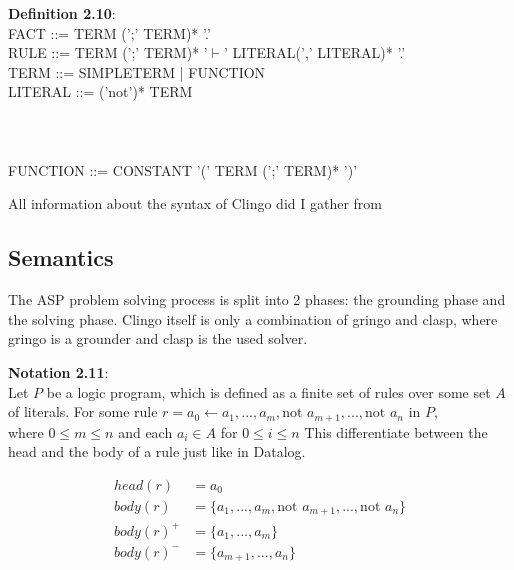 \documentclass[hyperref, bachelorofscience]{cgvpub}
\renewenvironment{shaded}{%
  \def\FrameCommand{\fboxsep=\FrameSep \colorbox{shadecolor}}%
  \MakeFramed{\advance\hsize-\width \FrameRestore\FrameRestore}}%
 {\endMakeFramed}
\begin{document}
\begin{shaded}
\textbf{Definition 2.10}: \\
FACT ::= TERM (';' TERM)* '.'  \\
RULE ::= TERM (';' TERM)* '$\vdash$' LITERAL(',' LITERAL)* '.'  \\
TERM ::= SIMPLETERM | FUNCTION \\
LITERAL ::= ('not')* TERM \\
 \\
 \\
 \\
FUNCTION ::= CONSTANT '(' TERM (';' TERM)* ')'
\end{shaded}

All information about the syntax of Clingo did I gather from \cite{KSWRB2014}

\subsection{Semantics}
The ASP problem solving process is split into 2 phases: the grounding phase and the solving phase.
Clingo itself is only a combination of gringo and clasp, where gringo is a grounder and clasp is the used solver.

\begin{shaded}
\textbf{Notation 2.11}: \\
Let $P$ be a logic program, which is defined as a finite set of rules over some set $A$ of literals. 
For some rule $r = a_0 \leftarrow a_1, ..., a_m, \text{not } a_{m+1}, ..., \text{not } a_n$ in $P$,\\
where $0 \leq m \leq n$ and each $a_i \in A$ for $0 \leq i \leq n$ 
This  differentiate between the head and the body of a rule just like in Datalog.

\begin{align*}
head(r) &= a_0  \\
body(r) &= \{ a_1, ... ,a_m, \text{not } a_{m+1}, ... , \text{not } a_n\} \\
body(r)^{+} &= \{ a_1, ... ,a_m \} \\
body(r)^{-} &= \{ a_{m+1} , ... , a_n \}
\end{align*}
\end{shaded}
\end{document}
